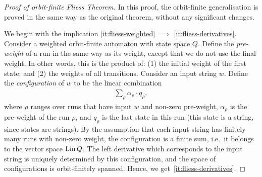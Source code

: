 \begin{proof}[Proof of orbit-finite Fliess Theorem] In this proof, the orbit-finite generalisation is proved in the same way as the original theorem, without any significant changes.

    We begin with the implication \ref{it:fliess-weighted} $\implies$ \ref{it:fliess-derivatives}. Consider a weighted orbit-finite automaton with state space $Q$. 
    Define the \emph{pre-weight} of a run in the same way as its weight, except that we do not use the final weight. In other words, this is the product of: (1) the initial weight of the first state; and (2) the weights of all transitions. Consider an input string $w$. Define the \emph{configuration} of $w$ to be the linear combination
    \begin{align}
        \label{eq:configuration-wa}
        \sum_\rho \alpha_\rho \cdot q_\rho,
    \end{align}
    where $\rho$ ranges over runs that have input $w$ and non-zero pre-weight, $\alpha_\rho$ is the pre-weight of the run $\rho$, and $q_\rho$ is the last state in this run (this state is a string, since states are strings). By the assumption that each input string has finitely many runs with non-zero weight, the configuration is a finite sum, i.e.~it belongs to the vector space $\operatorname{Lin} Q$. The left derivative which corresponds to the input string is uniquely determined by this configuration, and the space of configurations is orbit-finitely spanned. Hence, we get~\ref{it:fliess-derivatives}.


\end{proof}
